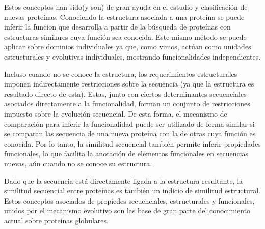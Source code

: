 Estos conceptos han sido(y son) de gran ayuda en el estudio y clasificación de nuevas proteínas. 
Conociendo la estructura asociada a una proteína se puede inferir la funcion que desarrolla a partir de la búsqueda de proteínas con estructuras similares cuya función sea conocida.
Este mismo método se puede aplicar sobre dominios individuales ya que, como vimos, actúan como unidades estructurales y evolutivas individuales, mostrando funcionalidades independientes.

Incluso cuando no se conoce la estructura, los requerimientos estructurales imponen indirectamente restricciones sobre la secuencia (ya que la estructura es resultado directo de esta).
Estas, junto con ciertos determinantes secuenciales asociados directamente a la funcionalidad, forman un conjunto de restricciones impuesto sobre la evolución secuencial.
De esta forma, el mecanismo de comparación para inferir la funcionalidad puede ser utilizado de forma similar si se comparan las secuencia de una nueva proteína con la de otras cuya función es conocida.
Por lo tanto, la similitud secuencial también permite inferir propiedades funcionales, lo que facilita la anotación de elementos funcionales en secuencias nuevas, aún cuando no se conoce su estructura.

Dado que la secuencia está directamente ligada a la estructura resultante, la similitud secuencial entre proteínas es también un indicio de similitud estructural.
Estos conceptos asociados de propiedes secuenciales, estructurales y funcionales, unidos por el mecanismo evolutivo son las base de gran parte del conocimiento actual sobre proteínas globulares.

% 






